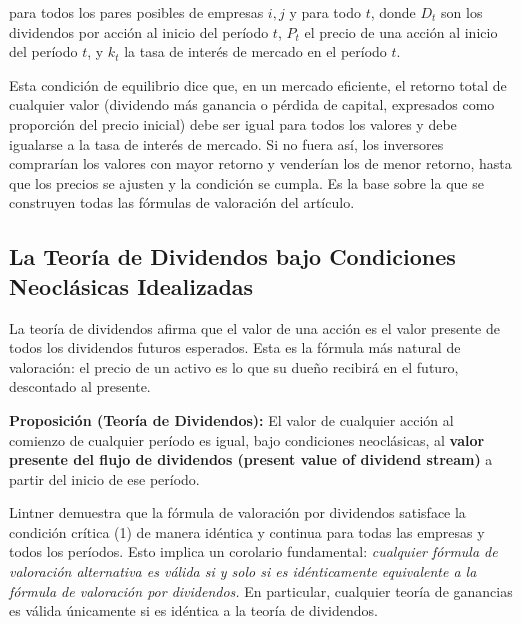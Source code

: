 \documentclass[12pt]{article}
\begin{document}
para todos los pares posibles de empresas $i, j$ y para todo $t$, donde $D_t$ son los dividendos por acci\'on al inicio del per\'iodo $t$, $P_t$ el precio de una acci\'on al inicio del per\'iodo $t$, y $k_t$ la tasa de inter\'es de mercado en el per\'iodo $t$.

\begin{explicacion}
Esta condici\'on de equilibrio dice que, en un mercado eficiente, el retorno total de cualquier valor (dividendo m\'as ganancia o p\'erdida de capital, expresados como proporci\'on del precio inicial) debe ser igual para todos los valores y debe igualarse a la tasa de inter\'es de mercado. Si no fuera as\'i, los inversores comprar\'ian los valores con mayor retorno y vender\'ian los de menor retorno, hasta que los precios se ajusten y la condici\'on se cumpla. Es la base sobre la que se construyen todas las f\'ormulas de valoraci\'on del art\'iculo.
\end{explicacion}

\subsection{La Teor\'ia de Dividendos bajo Condiciones Neocl\'asicas Idealizadas}

\begin{intuicion}
La teor\'ia de dividendos afirma que el valor de una acci\'on es el valor presente de todos los dividendos futuros esperados. Esta es la f\'ormula m\'as natural de valoraci\'on: el precio de un activo es lo que su due\~no recibir\'a en el futuro, descontado al presente.
\end{intuicion}

\textbf{Proposici\'on (Teor\'ia de Dividendos):} El valor de cualquier acci\'on al comienzo de cualquier per\'iodo es igual, bajo condiciones neocl\'asicas, al \textbf{valor presente del flujo de dividendos (present value of dividend stream)} a partir del inicio de ese per\'iodo.

\begin{explicacion}
Lintner demuestra que la f\'ormula de valoraci\'on por dividendos satisface la condici\'on cr\'itica (1) de manera id\'entica y continua para todas las empresas y todos los per\'iodos. Esto implica un corolario fundamental: \textit{cualquier f\'ormula de valoraci\'on alternativa es v\'alida si y solo si es id\'enticamente equivalente a la f\'ormula de valoraci\'on por dividendos.} En particular, cualquier teor\'ia de ganancias es v\'alida \'unicamente si es id\'entica a la teor\'ia de dividendos.
\end{explicacion}
\end{document}
